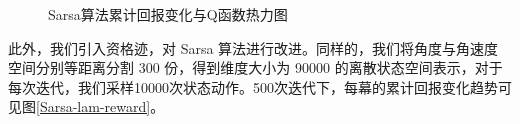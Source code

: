 \documentclass[conference,10pt]{IEEEtran}
\begin{document}
\begin{figure}[H]
	\centering
	\centering
\caption{Sarsa算法累计回报变化与Q函数热力图}
\label{Sarsaheat}
\end{figure}

此外，我们引入资格迹，对 Sarsa 算法进行改进。同样的，我们将角度与角速度空间分别等距离分割 300 份，得到维度大小为 90000 的离散状态空间表示，对于每次迭代，我们采样10000次状态动作。500次迭代下，每幕的累计回报变化趋势可见图\ref{Sarsa-lam-reward}。
\end{document}
